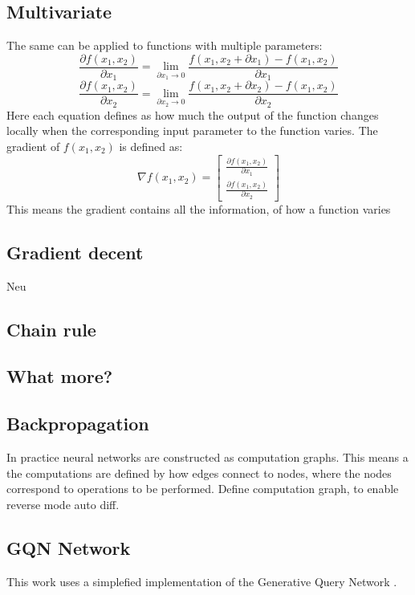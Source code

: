 \subsection{Multivariate}
The same can be applied to functions with multiple parameters:
\begin{equation}
	\frac{\partial f(x_1, x_2)}{\partial x_1} = \lim_{\partial x_1 \to 0}\frac{f(x_1, x_2 + \partial x_1) - f(x_1, x_2)}{\partial x_1}
\end{equation}
\begin{equation}
	\frac{\partial f(x_1, x_2)}{\partial x_2} = \lim_{\partial x_2 \to 0}\frac{f(x_1, x_2 + \partial x_2) - f(x_1, x_2)}{\partial x_2}
\end{equation}
Here each equation defines as how much the output of the function changes locally when the corresponding input parameter to the function varies.
The gradient of $f(x_1, x_2)$ is defined as:
\begin{equation}
\nabla f(x_1, x_2) =
	\begin{bmatrix}
	\frac{\partial f(x_1, x_2)}{\partial x_1} \\[2mm]
	\frac{\partial f(x_1, x_2)}{\partial x_2}
	\end{bmatrix}
\end{equation}
This means the gradient contains all the information, of how a function varies

\subsection{Gradient decent}
Neu

\subsection{Chain rule}
\subsection{What more?}


\subsection{Backpropagation}
In practice neural networks are constructed as computation graphs. This means a the computations are defined by how edges connect to nodes, where the nodes correspond to operations to be performed.
Define computation graph, to enable reverse mode auto diff.

\subsection{GQN Network}
This work uses a simplefied implementation of the Generative Query Network \cite{gqn}.

